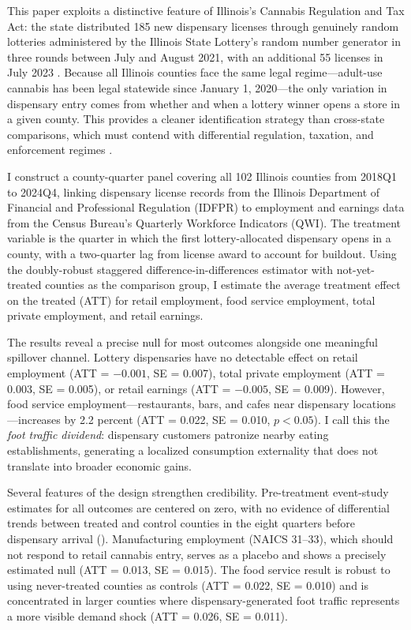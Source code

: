 \documentclass[12pt]{article}
\begin{document}
This paper exploits a distinctive feature of Illinois's Cannabis Regulation and Tax Act: the state distributed 185 new dispensary licenses through genuinely random lotteries administered by the Illinois State Lottery's random number generator in three rounds between July and August 2021, with an additional 55 licenses in July 2023 \citep{IDFPR2023}. Because all Illinois counties face the same legal regime---adult-use cannabis has been legal statewide since January 1, 2020---the only variation in dispensary entry comes from whether and when a lottery winner opens a store in a given county. This provides a cleaner identification strategy than cross-state comparisons, which must contend with differential regulation, taxation, and enforcement regimes \citep{Anderson2023, Chu2023}.

I construct a county-quarter panel covering all 102 Illinois counties from 2018Q1 to 2024Q4, linking dispensary license records from the Illinois Department of Financial and Professional Regulation (IDFPR) to employment and earnings data from the Census Bureau's Quarterly Workforce Indicators (QWI). The treatment variable is the quarter in which the first lottery-allocated dispensary opens in a county, with a two-quarter lag from license award to account for buildout. Using the \citet{CallawayAndSantAnna2021} doubly-robust staggered difference-in-differences estimator with not-yet-treated counties as the comparison group, I estimate the average treatment effect on the treated (ATT) for retail employment, food service employment, total private employment, and retail earnings.

The results reveal a precise null for most outcomes alongside one meaningful spillover channel. Lottery dispensaries have no detectable effect on retail employment (ATT = $-0.001$, SE = 0.007), total private employment (ATT = 0.003, SE = 0.005), or retail earnings (ATT = $-0.005$, SE = 0.009). However, food service employment---restaurants, bars, and cafes near dispensary locations---increases by 2.2 percent (ATT = 0.022, SE = 0.010, $p < 0.05$). I call this the \textit{foot traffic dividend}: dispensary customers patronize nearby eating establishments, generating a localized consumption externality that does not translate into broader economic gains.

Several features of the design strengthen credibility. Pre-treatment event-study estimates for all outcomes are centered on zero, with no evidence of differential trends between treated and control counties in the eight quarters before dispensary arrival (). Manufacturing employment (NAICS 31--33), which should not respond to retail cannabis entry, serves as a placebo and shows a precisely estimated null (ATT = 0.013, SE = 0.015). The food service result is robust to using never-treated counties as controls (ATT = 0.022, SE = 0.010) and is concentrated in larger counties where dispensary-generated foot traffic represents a more visible demand shock (ATT = 0.026, SE = 0.011).
\end{document}
